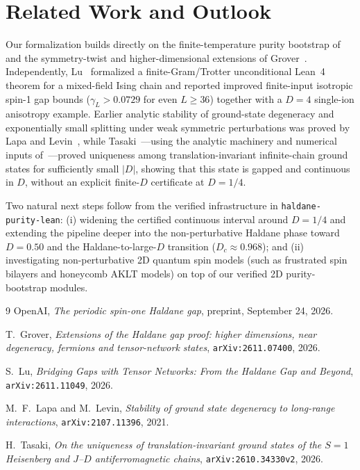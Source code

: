 \documentclass[11pt,a4paper]{article}
\newcommand{\id}[1]{{\small\nolinkurl{#1}}}
\begin{document}
\section{Related Work and Outlook}
Our formalization builds directly on the finite-temperature purity bootstrap of~\cite{openai2026haldane} and the symmetry-twist and higher-dimensional extensions of Grover~\cite{grover2026}.
Independently, Lu~\cite{lu2026} formalized a finite-Gram/Trotter unconditional Lean~4 theorem for a mixed-field Ising chain and reported improved finite-input isotropic spin-1 gap bounds ($\gamma_L > 0.0729$ for even $L \ge 36$) together with a $D = 4$ single-ion anisotropy example.
Earlier analytic stability of ground-state degeneracy and exponentially small splitting under weak symmetric perturbations was proved by Lapa and Levin~\cite{lapalevin2021}, while Tasaki~\cite{tasaki2026}---using the analytic machinery and numerical inputs of~\cite{openai2026haldane}---proved uniqueness among translation-invariant infinite-chain ground states for sufficiently small $|D|$, showing that this state is gapped and continuous in $D$, without an explicit finite-$D$ certificate at $D = 1/4$.

Two natural next steps follow from the verified infrastructure in \id{haldane-purity-lean}: (i) widening the certified continuous interval around $D = 1/4$ and extending the pipeline deeper into the non-perturbative Haldane phase toward $D = 0.50$ and the Haldane-to-large-$D$ transition ($D_c \approx 0.968$); and (ii) investigating non-perturbative 2D quantum spin models (such as frustrated spin bilayers and honeycomb AKLT models) on top of our verified 2D purity-bootstrap modules.

\begin{thebibliography}{9}
OpenAI, \emph{The periodic spin-one Haldane gap}, preprint, September 24, 2026.

T.~Grover, \emph{Extensions of the Haldane gap proof: higher dimensions, near degeneracy, fermions and tensor-network states}, \texttt{arXiv:2611.07400}, 2026.

S.~Lu, \emph{Bridging Gaps with Tensor Networks: From the Haldane Gap and Beyond}, \texttt{arXiv:2611.11049}, 2026.

M.~F.~Lapa and M.~Levin, \emph{Stability of ground state degeneracy to long-range interactions}, \texttt{arXiv:2107.11396}, 2021.

H.~Tasaki, \emph{On the uniqueness of translation-invariant ground states of the $S=1$ Heisenberg and $J$--$D$ antiferromagnetic chains}, \texttt{arXiv:2610.34330v2}, 2026.
\end{thebibliography}
\end{document}
